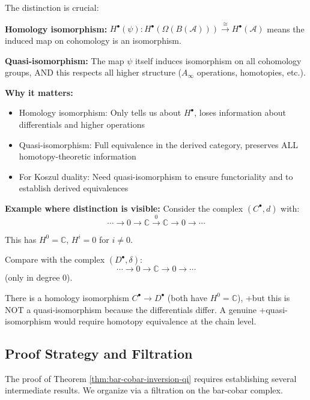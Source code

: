 \begin{remark}\label{rem:qi-vs-homology-iso}
The distinction is crucial:

\textbf{Homology isomorphism:} $H^\bullet(\psi): H^\bullet(\Omega(B(\mathcal{A}))) 
\xrightarrow{\cong} H^\bullet(\mathcal{A})$ means the induced map on cohomology 
is an isomorphism.

\textbf{Quasi-isomorphism:} The map $\psi$ itself induces isomorphism on all 
cohomology groups, AND this respects all higher structure ($A_\infty$ operations, 
homotopies, etc.).

\textbf{Why it matters:}
\begin{itemize}
\item Homology isomorphism: Only tells us about $H^\bullet$, loses information 
      about differentials and higher operations
      
\item Quasi-isomorphism: Full equivalence in the derived category, preserves 
      ALL homotopy-theoretic information
      
\item For Koszul duality: Need quasi-isomorphism to ensure functoriality and 
      to establish derived equivalences
\end{itemize}

\textbf{Example where distinction is visible:}
Consider the complex $(C^\bullet, d)$ with:
$$\cdots \to 0 \to \mathbb{C} \xrightarrow{0} \mathbb{C} \to 0 \to \cdots$$

This has $H^0 = \mathbb{C}$, $H^i = 0$ for $i \neq 0$.

Compare with the complex $(D^\bullet, \delta)$:
$$\cdots \to 0 \to \mathbb{C} \to 0 \to \cdots$$
(only in degree 0).

There is a homology isomorphism $C^\bullet \to D^\bullet$ (both have $H^0 = \mathbb{C}$), 
+but this is NOT a quasi-isomorphism because the differentials differ. A genuine 
+quasi-isomorphism would require homotopy equivalence at the chain level.
\end{remark}

\subsection{Proof Strategy and Filtration}

The proof of Theorem \ref{thm:bar-cobar-inversion-qi} requires establishing several 
intermediate results. We organize via a filtration on the bar-cobar complex.

